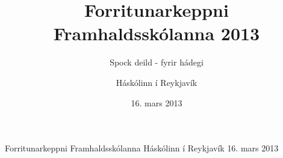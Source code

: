 \documentclass[11pt,a4paper,oneside]{article}
\title{Forritunarkeppni Framhaldsskólanna 2013}
\subtitle{Spock deild - fyrir hádegi}
\date{16. mars 2013}
\author{Háskólinn í Reykjavík}
\newcommand{\problemstatement}[1]{  }
\begin{document}

	\maketitle
	\thispagestyle{empty}
	\pagebreak

	\contest
	{Forritunarkeppni Framhaldsskólanna}%
	{Háskólinn í Reykjavík}%
	{16. mars 2013}%

	\problemstatement{TengdurListi}
	\problemstatement{OendanlegRuna}
	\problemstatement{FermatsLastTheorem}
	\problemstatement{SierpinskiTriangle}
	\problemstatement{KonunglegurMatur}
	\problemstatement{Frumtolur}
	\problemstatement{FatahengiSveinsLitla}
	\problemstatement{SkemmtilegarSetningar}
	\problemstatement{TicTacToe}
	\problemstatement{Bitmask}
\end{document}
